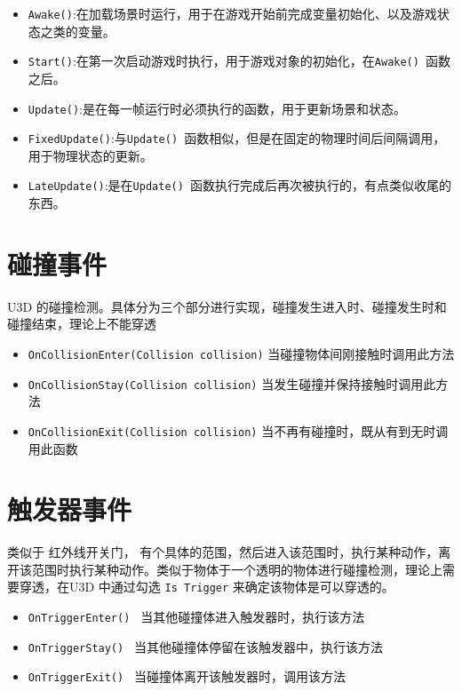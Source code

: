 \documentclass[UTF8,a4paper,12pt]{ctexbook}
\begin{document}
		\begin{itemize}
			\item \verb|Awake()|:在加载场景时运行，用于在游戏开始前完成变量初始化、以及游戏状态之类的变量。
			\item \verb|Start()|:在第一次启动游戏时执行，用于游戏对象的初始化，在\verb|Awake() |函数之后。
			\item \verb|Update()|:是在每一帧运行时必须执行的函数，用于更新场景和状态。
			\item \verb|FixedUpdate()|:与\verb|Update() |函数相似，但是在固定的物理时间后间隔调用，用于物理状态的更新。
			\item \verb|LateUpdate()|:是在\verb|Update() |函数执行完成后再次被执行的，有点类似收尾的东西。 
		\end{itemize}
			
	\section{碰撞事件}
		U3D 的碰撞检测。具体分为三个部分进行实现，碰撞发生进入时、碰撞发生时和碰撞结束，理论上不能穿透
		
		\begin{itemize}
			\item \verb|OnCollisionEnter(Collision collision)| 当碰撞物体间刚接触时调用此方法
			\item \verb|OnCollisionStay(Collision collision)| 当发生碰撞并保持接触时调用此方法
			\item \verb|OnCollisionExit(Collision collision)| 当不再有碰撞时，既从有到无时调用此函数
		\end{itemize}

	\section{触发器事件}
		类似于 红外线开关门， 有个具体的范围，然后进入该范围时，执行某种动作，离开该范围时执行某种动作。类似于物体于一个透明的物体进行碰撞检测，理论上需要穿透，在U3D 中通过勾选 \verb|Is Trigger| 来确定该物体是可以穿透的。
		
		\begin{itemize}
			\item \verb|OnTriggerEnter() | 当其他碰撞体进入触发器时，执行该方法
			\item \verb|OnTriggerStay() | 当其他碰撞体停留在该触发器中，执行该方法
			\item \verb|OnTriggerExit() | 当碰撞体离开该触发器时，调用该方法
		\end{itemize}
		
\end{document}
